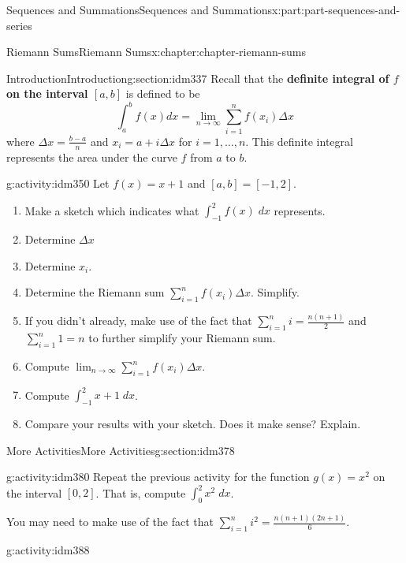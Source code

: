 \documentclass[oneside,10pt,]{book}
\newcommand{\terminology}[1]{\textbf{#1}}
\begin{document}
\begin{partptx}{Sequences and Summations}{}{Sequences and Summations}{}{}{x:part:part-sequences-and-series}
\begin{chapterptx}{Riemann Sums}{}{Riemann Sums}{}{}{x:chapter:chapter-riemann-sums}
\begin{sectionptx}{Introduction}{}{Introduction}{}{}{g:section:idm337}
Recall that the \terminology{definite integral of \(f\) on the interval \([a,b]\)} is defined to be%
\begin{equation*}
\int_a^b f(x) dx = \lim_{n \to \infty} \sum_{i=1}^n f(x_i)\Delta x
\end{equation*}
where \(\displaystyle \Delta x = \frac{b-a}{n}\) and \(x_i = a + i \Delta x\) for \(i = 1, \dots, n\). This definite integral represents the area under the curve \(f\) from \(a\) to \(b\).%
\begin{activity}{}{g:activity:idm350}%
Let \(f(x) = x+1\) and \([a,b] = [-1,2]\).%
\begin{enumerate}[font=\bfseries,label=(\alph*),ref=\alph*]
\item{}Make a sketch which indicates what \(\displaystyle\int_{-1}^2 f(x) \; dx\) represents.\item{}Determine \(\Delta x\)%
\item{}Determine \(x_i\).%
\item{}Determine the Riemann sum \(\displaystyle\sum_{i=1}^n f(x_i) \Delta x\). Simplify.%
\item{}If you didn't already, make use of the fact that \(\displaystyle \sum_{i=1}^n i = \frac{n(n+1)}{2}\) and \(\displaystyle \sum_{i=1}^n 1 = n\) to further simplify your Riemann sum.%
\item{}Compute \(\displaystyle\lim_{n \to \infty} \sum_{i=1}^n f(x_i) \Delta x\).%
\item{}Compute \(\displaystyle\int_{-1}^2 x+1 \; dx\).%
\item{}Compare your results with your sketch. Does it make sense? Explain.%
\end{enumerate}
\end{activity}
\end{sectionptx}
%
%
\typeout{************************************************}
\typeout{************************************************}
%
\begin{sectionptx}{More Activities}{}{More Activities}{}{}{g:section:idm378}
\begin{activity}{}{g:activity:idm380}%
Repeat the previous activity for the function \(g(x) = x^2\) on the interval \([0,2]\). That is, compute \(\displaystyle \int_0^2 x^2 \; dx\).%
\par
You may need to make use of the fact that \(\displaystyle\sum_{i=1}^n i^2 = \frac{n(n+1)(2n+1)}{6}\).%
\end{activity}
\begin{activity}{}{g:activity:idm388}%

\end{activity}
\end{sectionptx}
\end{chapterptx}
\end{partptx}
\end{document}
